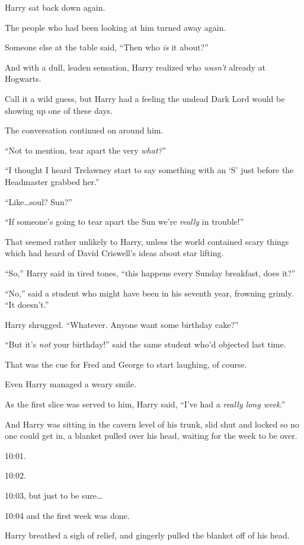 Harry sat back down again.

The people who had been looking at him turned away again.

Someone else at the table said, “Then who \emph{is} it about?”

And with a dull, leaden sensation, Harry realized who \emph{wasn’t} already at Hogwarts.

Call it a wild guess, but Harry had a feeling the undead Dark Lord would be showing up one of these days.

The conversation continued on around him.

“Not to mention, tear apart the very \emph{what?}”

“I thought I heard Trelawney start to say something with an ‘S’ just before the Headmaster grabbed her.”

“Like…soul? Sun?”

“If someone’s going to tear apart the Sun we’re \emph{really} in trouble!”

That seemed rather unlikely to Harry, unless the world contained scary things which had heard of David Criswell’s ideas about star lifting.

“So,” Harry said in tired tones, “this happens every Sunday breakfast, does it?”

“No,” said a student who might have been in his seventh year, frowning grimly. “It doesn’t.”

Harry shrugged. “Whatever. Anyone want some birthday cake?”

“But it’s \emph{not} your birthday!” said the same student who’d objected last time.

That was the cue for Fred and George to start laughing, of course.

Even Harry managed a weary smile.

As the first slice was served to him, Harry said, “I’ve had a \emph{really long week}.”

\later

And Harry was sitting in the cavern level of his trunk, slid shut and locked so no one could get in, a blanket pulled over his head, waiting for the week to be over.

10:01.

10:02.

10:03, but just to be sure…

10:04 and the first week was done.

Harry breathed a sigh of relief, and gingerly pulled the blanket off of his head.

